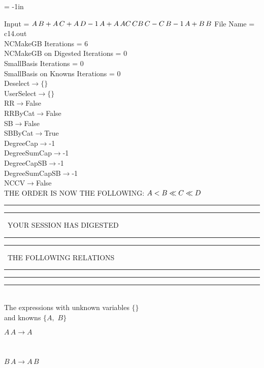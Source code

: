 \voffset = -1in
\evensidemargin 0.1in
\oddsidemargin 0.1in
\textheight 9in
\textwidth 6in

\normalsize
\baselineskip=12pt
\noindent
Input = 
$
\\A\,
 B + A\,
 C + A\,
 D\\
-1\,
 A + A\,
 A\\
C\,
 C\\
B\,
 C - C\,
 B\\
-1\,
 A + B\,
 B\\
$
File Name = c14.out\\
NCMakeGB Iterations = 6\\
NCMakeGB on Digested Iterations = 0\\
SmallBasis Iterations = 0\\
SmallBasis on Knowns Iterations = 0\\
Deselect$\rightarrow \{\}$\\
UserSelect$\rightarrow \{\}$\\
RR$\rightarrow $False\\
RRByCat$\rightarrow $False\\
SB$\rightarrow $False\\
SBByCat$\rightarrow $True\\
DegreeCap$\rightarrow $-1\\
DegreeSumCap$\rightarrow $-1\\
DegreeCapSB$\rightarrow $-1\\
DegreeSumCapSB$\rightarrow $-1\\
NCCV$\rightarrow $False\\
THE ORDER IS NOW THE FOLLOWING:\hfil\break
$
A<B\ll
C\ll
D\\
$
\rule[2pt]{6in}{4pt}\hfil\break
\rule[2pt]{1.879in}{4pt}
\ YOUR SESSION HAS DIGESTED\ 
\rule[2pt]{1.879in}{4pt}\hfil\break
\rule[2pt]{1.923in}{4pt}
\ THE FOLLOWING RELATIONS\ 
\rule[2pt]{1.923in}{4pt}\hfil\break
\rule[2pt]{6in}{4pt}\hfil\break
\rule[3pt]{6in}{.7pt}\\
The expressions with unknown variables $\{\}$\\
and knowns $\{A,
$ $
B\}$\smallskip\\
\begin{minipage}{6in}
$
A\,
 A\rightarrow A
$
\end{minipage}\medskip \\
\begin{minipage}{6in}
$
B\,
 A\rightarrow A\,
 B
$
\end{minipage}\medskip \\
